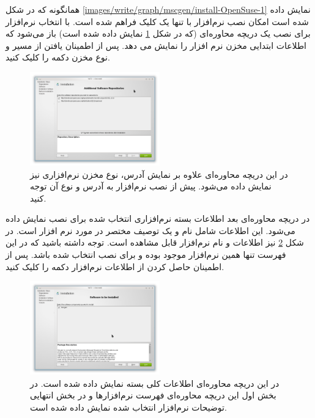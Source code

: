 همانگونه که در شکل \ref{images/write/graph/mscgen/install-OpenSuse-1} نمایش داده
شده است امکان نصب نرم‌افزار با تنها یک کلیک فراهم شده است. با انتخاب نرم‌افزار
برای نصب یک دریچه محاوره‌ای (که در شکل
\ref{images/write/graph/mscgen/install-OpenSuse-2} نمایش داده شده است) باز
می‌شود که اطلاعات ابتدایی مخزن نرم افزار را نمایش می دهد. پس از اطمینان یافتن از
مسیر و نوع مخزن دکمه  را کلیک کنید.

\begin{figure}
	\centering
	\includegraphics[width=0.5\textwidth]{images/write/graph/mscgen/install-OpenSuse-2}
	\caption[اطلاعات مخزن نرم‌افزاری برای نصب ]{
		در این دریچه محاوره‌ای علاوه بر نمایش آدرس، نوع مخزن نرم‌افزاری نیز نمایش داده
		می‌شود. پیش از نصب نرم‌افزار به آدرس و نوع آن توجه کنید.
	}
	\label{images/write/graph/mscgen/install-OpenSuse-2}
\end{figure}

در دریچه محاوره‌ای بعد اطلاعات بسته‌ نرم‌افزاری انتخاب شده برای نصب نمایش داده
می‌شود. این اطلاعات شامل نام و یک توصیف مختصر در مورد نرم افزار است. در شکل
\ref{images/write/graph/mscgen/install-OpenSuse-3} نیز اطلاعات و نام نرم‌افزار
 قابل مشاهده است. توجه داشته باشید که در این فهرست تنها همین
نرم‌افزار موجود بوده و برای نصب انتخاب شده باشد. پس از اطمینان حاصل کردن از
اطلاعات نرم‌افزار دکمه  را کلیک کنید.

\begin{figure}
	\centering
	\includegraphics[width=0.5\textwidth]{images/write/graph/mscgen/install-OpenSuse-3}
	\caption[اطلاعات نرم‌افزار ]{
		در این دریچه محاوره‌ای اطلاعات کلی بسته  نمایش داده شده است. در بخش
		اول این دریچه محاوره‌ای فهرست نرم‌افزارها و در بخش انتهایی توضیحات نرم‌افزار
		انتخاب شده نمایش داده شده است.
	}
	\label{images/write/graph/mscgen/install-OpenSuse-3}
\end{figure}


